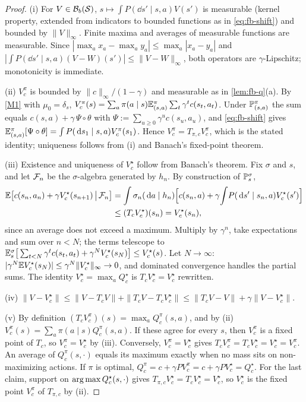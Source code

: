 \begin{proof}
(i) For $V\in\mathcal B_b(\mathcal{S})$, $s\mapsto\int P(\dd s'\mid s,a)V(s')$ is measurable (kernel property, extended from indicators to bounded functions as in \eqref{eq:fb-shift}) and bounded by $\|V\|_\infty$.
Finite maxima and averages of measurable functions are measurable.
Since $|\max_ax_a-\max_ay_a|\le\max_a|x_a-y_a|$ and $|\int P(\dd s'\mid s,a)(V-W)(s')|\le\|V-W\|_\infty$, both operators are $\gamma$-Lipschitz; monotonicity is immediate.

(ii) $V^\pi_c$ is bounded by $\|c\|_\infty/(1-\gamma)$ and measurable as in \cref{lem:fb-q}(a).
By \ref{M1} with $\mu_0=\delta_s$, $V^\pi_c(s)=\sum_a\pi(a\mid s)\mathbb{E}^\pi_{(s,a)}\sum_t\gamma^tc(s_t,a_t)$.
Under $\mathbb{P}^\pi_{(s,a)}$ the sum equals $c(s,a)+\gamma\,\Psi\circ\theta$ with $\Psi:=\sum_{u\ge0}\gamma^uc(s_u,a_u)$, and \eqref{eq:fb-shift} gives $\mathbb{E}^\pi_{(s,a)}[\Psi\circ\theta]=\int P(\,\mathrm{d} s_1\mid s,a)V^\pi_c(s_1)$.
Hence $V^\pi_c=T_{\pi,c}V^\pi_c$, which is the stated identity; uniqueness follows from (i) and Banach's fixed-point theorem.

(iii) Existence and uniqueness of $V^\star_c$ follow from Banach's theorem.
Fix $\sigma$ and $s$, and let $\mathcal{F}_n$ be the $\sigma$-algebra generated by $h_n$. By construction of $\mathbb{P}^\sigma_s$,
\begin{align*}
\mathbb{E}\big[c(s_n,a_n)+\gamma V^\star_c(s_{n+1})\,\big|\,\mathcal{F}_n\big]&=\int\sigma_n(\,\mathrm{d} a\mid h_n)\Big[c(s_n,a)+\gamma\!\int\!P(\,\mathrm{d} s'\mid s_n,a)V^\star_c(s')\Big]\\
&\le(T_cV^\star_c)(s_n)=V^\star_c(s_n),
\end{align*}
since an average does not exceed a maximum.
Multiply by $\gamma^n$, take expectations and sum over $n<N$; the terms telescope to
$\mathbb{E}^\sigma_s\big[\sum_{t<N}\gamma^tc(s_t,a_t)+\gamma^NV^\star_c(s_N)\big]\le V^\star_c(s)$.
Let $N\to\infty$: $|\gamma^N\mathbb{E} V^\star_c(s_N)|\le\gamma^N\|V^\star_c\|_\infty\to0$, and dominated convergence handles the partial sums.
The identity $V^\star_c=\max_aQ^\star_c$ is $T_cV^\star_c=V^\star_c$ rewritten.

(iv) $\|V-V^\star_c\|\le\|V-T_cV\|+\|T_cV-T_cV^\star_c\|\le\|T_cV-V\|+\gamma\|V-V^\star_c\|$.

(v) By definition $(T_cV^\pi_c)(s)=\max_aQ^\pi_c(s,a)$, and by (ii) $V^\pi_c(s)=\sum_a\pi(a\mid s)Q^\pi_c(s,a)$.
If these agree for every $s$, then $V^\pi_c$ is a fixed point of $T_c$, so $V^\pi_c=V^\star_c$ by (iii).
Conversely, $V^\pi_c=V^\star_c$ gives $T_cV^\pi_c=T_cV^\star_c=V^\star_c=V^\pi_c$.
An average of $Q^\pi_c(s,\cdot)$ equals its maximum exactly when no mass sits on non-maximizing actions.
If $\pi$ is optimal, $Q^\pi_c=c+\gamma PV^\pi_c=c+\gamma PV^\star_c=Q^\star_c$.
For the last claim, support on $\operatorname*{arg\,max} Q^\star_c(s,\cdot)$ gives $T_{\pi,c}V^\star_c=T_cV^\star_c=V^\star_c$, so $V^\star_c$ is the fixed point $V^\pi_c$ of $T_{\pi,c}$ by (ii).
\end{proof}


